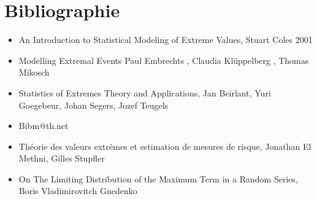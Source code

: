 \documentclass{article}
\theoremstyle{plain}
\theoremstyle{definition}
\theoremstyle{plain}
\begin{document}
\newpage
\section*{Bibliographie}

\begin{itemize}
	\item An Introduction to Statistical Modeling of Extreme Values, Stuart Coles 2001
	\item Modelling Extremal Events  Paul Embrechts , Claudia Klüppelberg , Thomas Mikosch
	\item Statistics of Extremes Theory and Applications, Jan Beirlant, Yuri Goegebeur, Johan Segers, Jozef Teugels
	\item Bibm@th.net
	\item Théorie des valeurs extrêmes et estimation de mesures de risque, Jonathan El Methni, Gilles Stupfler
	\item On The Limiting Distribution of the Maximum Term in a Random Series, Boris Vladimirovitch Gnedenko
\end{itemize}
\end{document}
